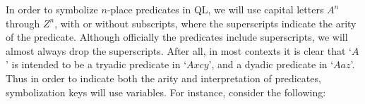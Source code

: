 %
%
%
%

In order to symbolize  $n$-place predicates in QL, we will use capital letters $A^n$ through $Z^n$, with or without subscripts, where the superscripts indicate the arity of the predicate.
Although officially the predicates include superscripts, we will almost always drop the superscripts.
After all, in most contexts it is clear that `$A$' is intended to be a tryadic predicate in `$Axcy$', and a dyadic predicate in `$Aaz$'.
Thus in order to indicate both the arity and interpretation of predicates, symbolization keys will use variables.
For instance, consider the following:

